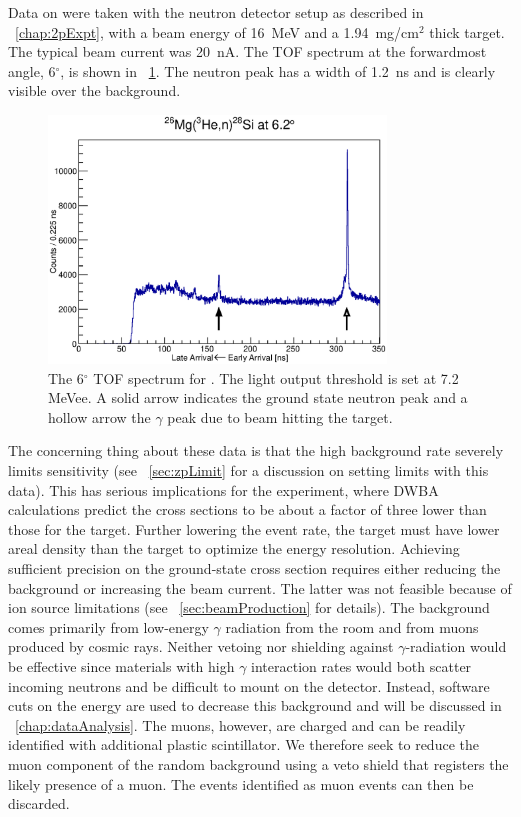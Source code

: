 Data on \MgReaction were taken with the neutron detector setup as described in {\chap}~\ref{chap:2pExpt}, with a beam energy of 16~MeV and a 1.94~mg/cm$^2$ thick  target.  The typical beam current was 20~nA. The TOF spectrum at the forwardmost angle, 6$^{\circ}$, is shown in {\fig}~\ref{fig:MgTOF}.  The neutron peak has a width of 1.2~ns and is clearly visible over the background. 
\begin{figure}[!htbp]
\centering
\includegraphics[width=0.8\textwidth]{figures/26Mg_veryOld.eps}
\caption{The 6$^{\circ}$ TOF spectrum for \MgReaction.  The light output threshold is set at 7.2 MeVee.  A solid arrow indicates the ground state neutron peak and a hollow arrow the $\gamma$ peak due to beam hitting the target.}
\label{fig:MgTOF}
\end{figure}

The concerning thing about these data is that the high background rate severely limits sensitivity (see {\sect}~\ref{sec:zpLimit} for a discussion on setting limits with this data).  This has serious implications for the \GeTargets experiment, where DWBA calculations predict the cross sections to be about a factor of three lower than those for the  target.  Further lowering the event rate, the \GeTargets target must have lower areal density than the  target to optimize the energy resolution.  Achieving sufficient precision on the ground-state cross section requires either reducing the background or increasing the beam current.  The latter was not feasible because of ion source limitations (see {\sect}~\ref{sec:beamProduction} for details).  The background comes primarily from low-energy $\gamma$ radiation from the room and from muons produced by cosmic rays.  Neither vetoing nor shielding against $\gamma$-radiation would be effective since materials with high $\gamma$ interaction rates would both scatter incoming neutrons and be difficult to mount on the detector.  Instead, software cuts on the energy are used to decrease this background and will be discussed in {\chap}~\ref{chap:dataAnalysis}.  The muons, however, are charged and can be readily identified with additional plastic scintillator.  We therefore seek to reduce the muon component of the random background using a veto shield that registers the likely presence of a muon.  The events identified as muon events can then be discarded.  


